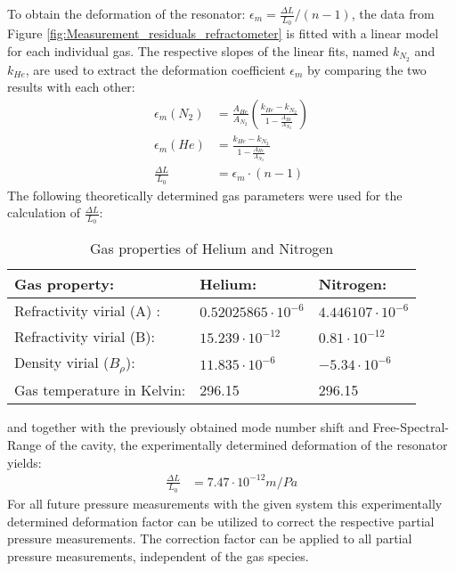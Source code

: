 To obtain the deformation of the resonator: $\epsilon_m = \frac{\Delta L}{L_0}/(n-1)$, the data from Figure \ref{fig:Measurement_residuals_refractometer} is fitted with a linear model for each individual gas. The respective slopes of the linear fits, named $k_{N_2}$ and $k_{He}$, are used to extract the deformation coefficient $\epsilon_m$ by comparing the two results with each other:
\begin{align}
	\epsilon_{m}(N_2)&=\frac{A_{He}}{A_{N_2}}\left( \frac{k_{He}-k_{N_2}}{1-\frac{A_{He}}{A_{N_2}}}  \right)\\
	\epsilon_{m}(He)&=\frac{k_{He}-k_{N_2}}{1-\frac{A_{He}}{A_{N_2}}}\\
	\frac{\Delta L}{L_0}&= \epsilon_{m} \cdot (n-1)
\end{align}
The following theoretically determined gas parameters were used for the calculation of $\frac{\Delta L}{L_0}$:
\begin{table}[H]
	\begin{center}
		\begin{tabular}{ lll }
			
			Gas property: & Helium: & Nitrogen:\\
			\toprule
			Refractivity virial (A) : & $0.52025865 \cdot 10^{-6}$   & $4.446107\cdot 10^{-6}$ \\
			\midrule
		    Refractivity virial (B):  &  $15.239 \cdot 10^{-12}$ & $0.81 \cdot 10^{-12}$\\
			\midrule
			Density virial ($B_{\rho}$):  &  $11.835 \cdot 10^{-6}$ & $-5.34 \cdot 10^{-6}$\\
			\midrule
			Gas temperature in Kelvin:  &  296.15 & 296.15\\
			\bottomrule
		\end{tabular}
	\end{center}
	\caption{Gas properties of Helium and Nitrogen}
	\label{table:gas_properties_Helium_Nitrogen}
\end{table}
\noindent
and together with the previously obtained mode number shift and Free-Spectral-Range of the cavity, the experimentally determined deformation of the resonator yields: 
\begin{align}
	\frac{\Delta L}{L_0}&=  7.47 \cdot 10^{-12} m/Pa
\end{align}
For all future pressure measurements with the given system this experimentally determined deformation factor can be utilized to correct the respective partial pressure measurements. The correction factor can be applied to all partial pressure measurements, independent of the gas species.

